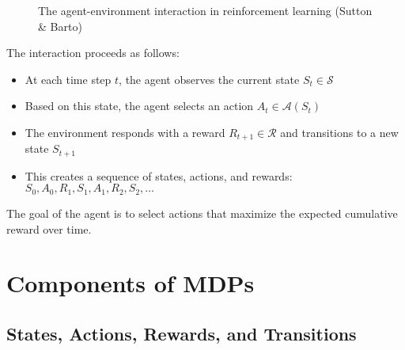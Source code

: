 \documentclass[12pt,a4paper]{article}
\begin{document}
\begin{figure}[H]
\centering
{}
\caption{The agent-environment interaction in reinforcement learning (Sutton \& Barto)}
\end{figure}

The interaction proceeds as follows:
\begin{itemize}
    \item At each time step $t$, the agent observes the current state $S_t \in \mathcal{S}$
    \item Based on this state, the agent selects an action $A_t \in \mathcal{A}(S_t)$
    \item The environment responds with a reward $R_{t+1} \in \mathcal{R}$ and transitions to a new state $S_{t+1}$
    \item This creates a sequence of states, actions, and rewards: $S_0, A_0, R_1, S_1, A_1, R_2, S_2, \ldots$
\end{itemize}

The goal of the agent is to select actions that maximize the expected cumulative reward over time.

\section{Components of MDPs}

\subsection{States, Actions, Rewards, and Transitions}
\end{document}

